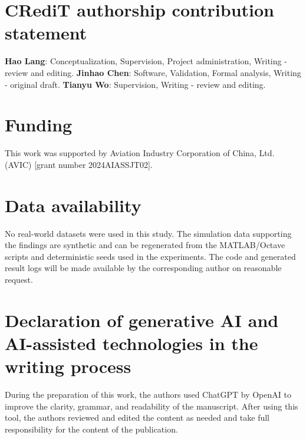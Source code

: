 \section*{CRediT authorship contribution statement}

\textbf{Hao Lang}: Conceptualization, Supervision, Project administration, Writing - review and editing. \textbf{Jinhao Chen}: Software, Validation, Formal analysis, Writing - original draft. \textbf{Tianyu Wo}: Supervision, Writing - review and editing.

\section*{Funding}

This work was supported by Aviation Industry Corporation of China, Ltd. (AVIC) [grant number 2024AIASSJT02].

\section*{Data availability}

No real-world datasets were used in this study. The simulation data supporting the findings are synthetic and can be regenerated from the MATLAB/Octave scripts and deterministic seeds used in the experiments. The code and generated result logs will be made available by the corresponding author on reasonable request.

\section*{Declaration of generative AI and AI-assisted technologies in the writing process}

During the preparation of this work, the authors used ChatGPT by OpenAI to improve the clarity, grammar, and readability of the manuscript. After using this tool, the authors reviewed and edited the content as needed and take full responsibility for the content of the publication.
